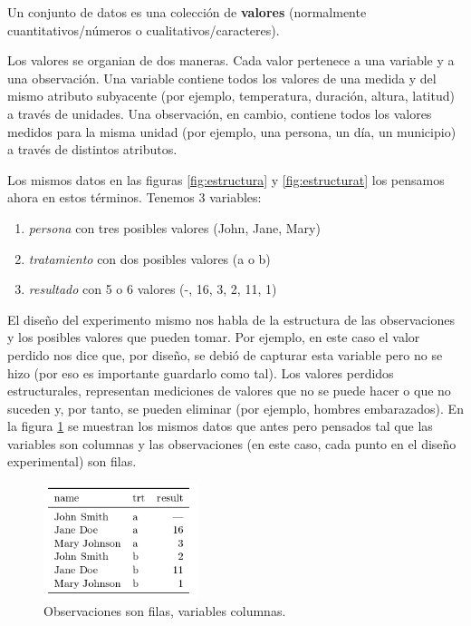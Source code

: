 \documentclass[]{article}
\begin{document}
Un conjunto de datos es una colección de \textbf{valores} (normalmente
cuantitativos/números o cualitativos/caracteres).

Los valores se organian de dos maneras. Cada valor pertenece a una
variable y a una observación. Una variable contiene todos los valores de
una medida y del mismo atributo subyacente (por ejemplo, temperatura,
duración, altura, latitud) a través de unidades. Una observación, en
cambio, contiene todos los valores medidos para la misma unidad (por
ejemplo, una persona, un día, un municipio) a través de distintos
atributos.

Los mismos datos en las figuras \ref{fig:estructura} y
\ref{fig:estructurat} los pensamos ahora en estos términos. Tenemos 3
variables:

\begin{enumerate}
\def\labelenumi{\arabic{enumi}.}
\itemsep1pt\parskip0pt
\item
  \emph{persona} con tres posibles valores (John, Jane, Mary)
\item
  \emph{tratamiento} con dos posibles valores (a o b)
\item
  \emph{resultado} con 5 o 6 valores (-, 16, 3, 2, 11, 1)
\end{enumerate}

El diseño del experimento mismo nos habla de la estructura de las
observaciones y los posibles valores que pueden tomar. Por ejemplo, en
este caso el valor perdido nos dice que, por diseño, se debió de
capturar esta variable pero no se hizo (por eso es importante guardarlo
como tal). Los valores perdidos estructurales, representan mediciones de
valores que no se puede hacer o que no suceden y, por tanto, se pueden
eliminar (por ejemplo, hombres embarazados). En la figura
\ref{fig:estructuratidy} se muestran los mismos datos que antes pero
pensados tal que las variables son columnas y las observaciones (en este
caso, cada punto en el diseño experimental) son filas.

\begin{figure}[h]
    \centering
    \includegraphics[width=0.4\textwidth]{../img/02_estructuratidy.png}
    \caption{Observaciones son filas, variables columnas.}
    \label{fig:estructuratidy}
\end{figure}
\end{document}
